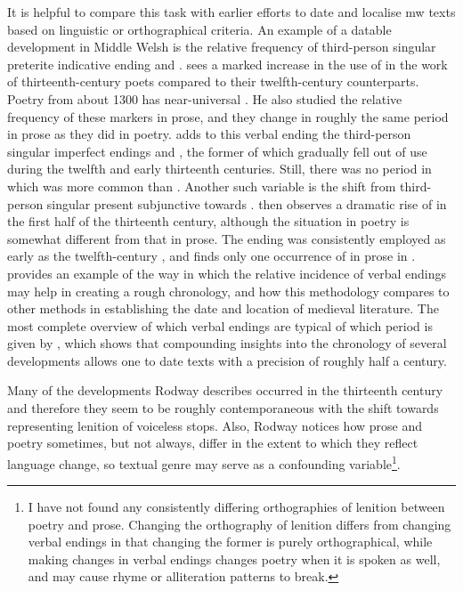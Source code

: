 It is helpful to compare this task with earlier efforts to date and localise \gls{mw} texts based on linguistic or orthographical criteria.
An example of a datable development in Middle Welsh is the relative frequency of third-person singular preterite indicative ending  and . \Textcite{Rod_Datable98} sees a marked increase in the use of  in the work of thirteenth-century poets compared to their twelfth-century counterparts. Poetry from about 1300 has near-universal . He also studied the relative frequency of these markers in prose, and they change in roughly the same period in prose as they did in poetry. \Textcite[68--71]{Rod_Two03} adds to this verbal ending the third-person singular imperfect endings  and \ei, the former of which gradually fell out of use during the twelfth and early thirteenth centuries. Still, there was no period in which  was more common than \ei. Another such variable is the shift from third-person singular present subjunctive  towards . \Textcite[71--73]{Rod_Two03} then observes a dramatic rise of  in the first half of the thirteenth century, although the situation in poetry is somewhat different from that in prose. The ending  was consistently employed as early as the twelfth-century , and \textcite[73]{Rod_Two03} finds only one occurrence of  in prose in . \Textcite{Rod_Where07} provides an example of the way in which the relative incidence of verbal endings may help in creating a rough chronology, and how this methodology compares to other methods in establishing the date and location of medieval literature. The most complete overview of which verbal endings are typical of which period is given by \textcite[166]{rodway_dating_2013}, which shows that compounding insights into the chronology of several developments allows one to date texts with a precision of roughly half a century.

Many of the developments Rodway describes occurred in the thirteenth century and therefore they seem to be roughly contemporaneous with the shift towards representing lenition of voiceless stops. Also, Rodway notices how prose and poetry sometimes, but not always, differ in the extent to which they reflect language change, so textual genre may serve as a confounding variable\footnote{I have not found any consistently differing orthographies of lenition between poetry and prose. Changing the orthography of lenition differs from changing verbal endings in that changing the former is purely orthographical, while making changes in verbal endings changes poetry when it is spoken as well, and may cause rhyme or alliteration patterns to break.}.

